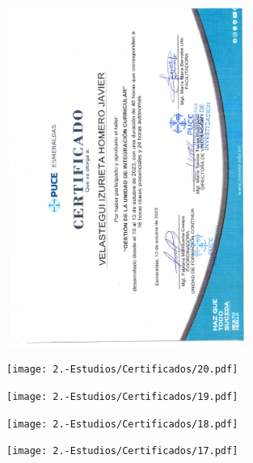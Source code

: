 \begin{figure}[ht]
    \setlength{\parindent}{-20pt}
    \includegraphics[width=0.7\textwidth, angle=-90]{2.-Estudios/Certificados/21.pdf}
\end{figure}


\begin{figure}[ht]
    \setlength{\parindent}{-20pt}
    \texttt{[image: 2.-Estudios/Certificados/20.pdf]}
\end{figure}

\begin{figure}[ht]
    \setlength{\parindent}{-20pt}
    \texttt{[image: 2.-Estudios/Certificados/19.pdf]}
\end{figure}

\begin{figure}[ht]
    \setlength{\parindent}{-20pt}
    \texttt{[image: 2.-Estudios/Certificados/18.pdf]}
\end{figure}

\begin{figure}[ht]
    \setlength{\parindent}{-20pt}
    \texttt{[image: 2.-Estudios/Certificados/17.pdf]}
\end{figure}

